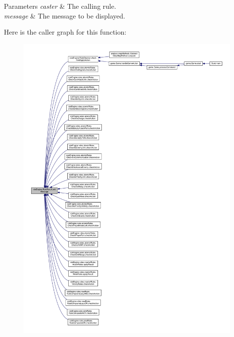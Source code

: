 \begin{DoxyParams}{Parameters}
{\em caster} & The calling rule. \\
\hline
{\em message} & The message to be displayed. \\
\hline
\end{DoxyParams}
Here is the caller graph for this function\+:
\nopagebreak
\begin{figure}[H]
\begin{center}
\leavevmode
\includegraphics[width=350pt]{classrule_engine_1_1_rule_result_a530d8dd9cb3461dba440b37e12347f5a_icgraph}
\end{center}
\end{figure}
\mbox{\label{classrule_engine_1_1_rule_result_ac85ac250467bcd26915ef4032890037c}} 
